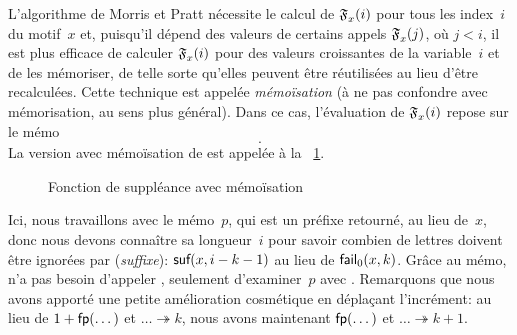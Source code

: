 L'algorithme de Morris et Pratt nécessite le calcul de
\(\mathfrak{F}_{x}^{}(i)\) pour tous les index~\(i\) du motif~\(x\) et,
puisqu'il dépend des valeurs de certains appels
\(\mathfrak{F}_{x}^{}(j)\), où \(j < i\), il est plus efficace de calculer
\(\mathfrak{F}_{x}^{}(i)\) pour des valeurs croissantes de la
variable~\(i\) et de les mémoriser, de telle sorte qu'elles peuvent
être réutilisées au lieu d'être recalculées. Cette technique est
appelée \emph{mémoïsation} (à ne pas confondre avec
mémorisation, au sens plus général). Dans ce cas, l'évaluation de
\(\mathfrak{F}_{x}^{}(i)\) repose sur le mémo
\begin{equation*}
[\pair{\ind{x}{i-1}}{\MPfailure{x}{}{i-1}},
\pair{\ind{x}{i-2}}{\MPfailure{x}{}{i-2}}, \dots,
\pair{\ind{x}{0}}{\MPfailure{x}{}{0}}].
\end{equation*}
La version avec mémoïsation de  est appelée
 à la \fig~\ref{fig_fail}.
\begin{figure}[b]
\centering
\abovedisplayskip=0pt
\belowdisplayskip=0pt
\caption{Fonction de suppléance avec mémoïsation\label{fig_fail}}
\end{figure}
Ici, nous travaillons avec le mémo~\(p\), qui est un préfixe retourné,
au lieu de~\(x\), donc nous devons connaître sa longueur~\(i\) pour
savoir combien de lettres doivent être ignorées par
 (\emph{suffixe}):
\(\textsf{suf}(x,i-k-1)\) au lieu de \(\textsf{fail}_0(x,k)\). Grâce au
mémo,  n'a pas besoin d'appeler , seulement
d'examiner~\(p\) avec . Remarquons que nous avons apporté
une petite amélioration cosmétique en déplaçant l'incrément: au lieu
de \(1 + \textsf{fp}(\dots)\) et \(\dots \twoheadrightarrow k\), nous
avons maintenant \(\textsf{fp}(\dots)\) et \(\dots \twoheadrightarrow
k+1\).

